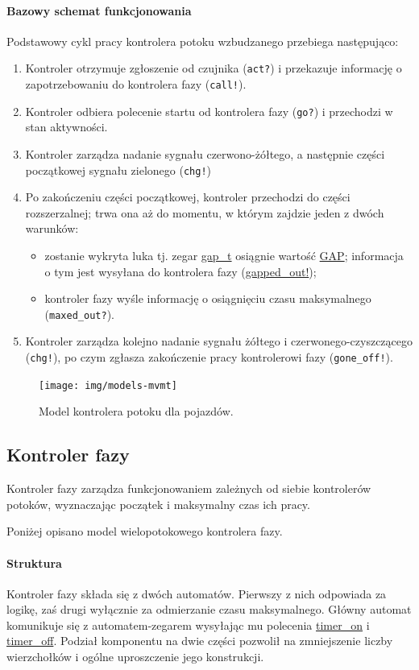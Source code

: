\documentclass{pracamgr}
\theoremstyle{plain}
\begin{document}
\paragraph{Bazowy schemat funkcjonowania} Podstawowy cykl pracy
kontrolera potoku wzbudzanego przebiega następująco:
\begin{enumerate}
  \item Kontroler otrzymuje zgłoszenie od czujnika (\texttt{act?}) i przekazuje
  informację o zapotrzebowaniu do kontrolera fazy (\texttt{call!}).
  \item Kontroler odbiera polecenie startu od kontrolera fazy
  (\texttt{go?}) i przechodzi w stan aktywności.
  \item Kontroler zarządza nadanie sygnału czerwono-żółtego, a
  następnie części początkowej sygnału zielonego (\texttt{chg!})
  \item Po zakończeniu części początkowej, kontroler przechodzi do
  części rozszerzalnej; trwa ona aż do momentu, w którym zajdzie jeden
  z dwóch warunków:
  \begin{itemize}
    \item zostanie wykryta luka tj. zegar \url{gap_t} osiągnie wartość
    \url{GAP}; informacja o tym jest wysyłana do kontrolera fazy
    (\url{gapped_out!});
    \item kontroler fazy wyśle informację o osiągnięciu czasu
    maksymalnego (\texttt{maxed\_out?}).
  \end{itemize}
  \item Kontroler zarządza kolejno nadanie sygnału żółtego i
  czerwonego-czyszczącego (\texttt{chg!}), po czym zgłasza zakończenie pracy
  kontrolerowi fazy (\texttt{gone\_off!}).
\end{enumerate}

\begin{figure}
  \centering
  \texttt{[image: img/models-mvmt]}
  \caption{Model kontrolera potoku dla pojazdów.}
  \label{img:mvmt-ctrl}
\end{figure}

\subsection{Kontroler fazy}
Kontroler fazy zarządza funkcjonowaniem zależnych od siebie
kontrolerów potoków, wyznaczając początek i maksymalny czas ich pracy.

Poniżej opisano model wielopotokowego kontrolera fazy.
\paragraph{Struktura} Kontroler fazy składa się z dwóch
automatów. Pierwszy z nich odpowiada za logikę, zaś drugi wyłącznie za
odmierzanie czasu maksymalnego. Główny automat komunikuje się z
automatem-zegarem wysyłając mu polecenia \url{timer_on} i
\url{timer_off}. Podział komponentu na dwie części pozwolił na
zmniejszenie liczby wierzchołków i ogólne uproszczenie jego konstrukcji.
\end{document}
